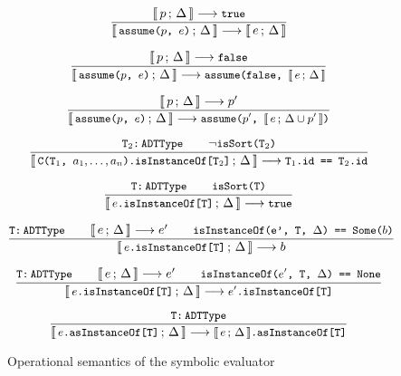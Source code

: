 \documentclass[a4paper,twoside]{article}
\newcommand{\lb}[2]{\llbracket\, #1\,;\, #2\, \rrbracket}
\newcommand{\stt}[1]{\texttt{\small{#1}}}
\begin{document}
\begin{figure}[htb]
\begin{framed}
\begin{equation}
\dfrac{
  \lb{p}{\Delta} \longrightarrow \stt{true}
}{
  \lb{\stt{assume($p$, $e$)}}{\Delta} \longrightarrow \lb{e}{\Delta}
}
\end{equation}

\begin{equation}
\dfrac{
  \lb{p}{\Delta} \longrightarrow \stt{false}
}{
  \lb{\stt{assume($p$, $e$)}}{\Delta} \longrightarrow
  \stt{assume(false, $\lb{e}{\Delta}$}
}
\end{equation}

\begin{equation}
\dfrac{
  \lb{p}{\Delta} \longrightarrow p'
}{
  \lb{\stt{assume($p$, $e$)}}{\Delta} \longrightarrow
  \stt{assume($p'$, $\lb{e}{\Delta \cup p'}$)}
}
\end{equation}

\begin{equation}
\dfrac{
  \stt{T$_2$:\,ADTType} \qquad
  \neg \stt{isSort(T$_2$)}
}{
  \lb{\stt{C(T$_1$, $a_1, \ldots, a_n$).isInstanceOf[T$_2$]}}{\Delta}
  \longrightarrow \stt{T$_1$.id == T$_2$.id}
}
\end{equation}

\begin{equation}
\dfrac{
  \stt{T:\,ADTType} \qquad
  \stt{isSort(T)}
}{
  \lb{\stt{$e$.isInstanceOf[T]}}{\Delta} \longrightarrow \stt{true}
}
\end{equation}

\begin{equation}
\dfrac{
  \stt{T:\,ADTType} \qquad
  \lb{e}{\Delta} \longrightarrow e' \qquad
  \stt{isInstanceOf(e', T, $\Delta$) == Some($b$)}
}{
  \lb{\stt{$e$.isInstanceOf[T]}}{\Delta} \longrightarrow b
}
\end{equation}

\begin{equation}
\dfrac{
  \stt{T:\,ADTType} \qquad
  \lb{e}{\Delta} \longrightarrow e' \qquad
  \stt{isInstanceOf($e'$, T, $\Delta$) == None}
}{
  \lb{\stt{$e$.isInstanceOf[T]}}{\Delta} \longrightarrow \stt{$e'$.isInstanceOf[T]}
}
\end{equation}

\begin{equation}
\dfrac{
  \stt{T:\,ADTType}
}{
  \lb{\stt{$e$.asInstanceOf[T]}}{\Delta} \longrightarrow \stt{$\lb{e}{\Delta}$.asInstanceOf[T]}
}
\end{equation}

\end{framed}
\vspace{-10pt}
\caption{Operational semantics of the symbolic evaluator \label{fig:symbolicsem}}
\end{figure}
\end{document}
